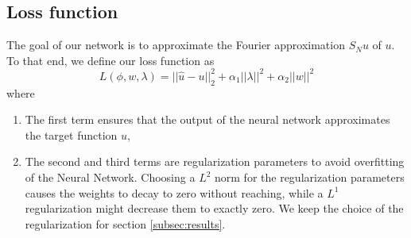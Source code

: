 \documentclass[11pt]{article}
\begin{document}
\subsection{Loss function}
The goal of our network is to approximate the Fourier approximation $S_N u$ of $u$. To that end, we define our loss function as
 \begin{equation}\label{lossfunction}
     L(\phi, w, \lambda) = ||\hat{u} - u ||_2^2  + \alpha_1||\lambda||^2 + \alpha_2||w||^2
 \end{equation}
 where
 \begin{enumerate}
     \item The first term ensures that the output of the neural network approximates the target function $u$,
     \item The second and third terms are regularization parameters to avoid overfitting of the Neural Network. Choosing a $L^2$ norm for the regularization parameters causes the weights to decay to zero without reaching, while a $L^1$ regularization might decrease them to exactly zero. We keep the choice of the regularization for section \ref{subsec:results}.
 \end{enumerate}
 
\end{document}

